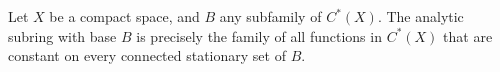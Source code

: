 Let $X$ be a compact space, and $B$ any subfamily of $C^*(X)$. The analytic subring with base $B$ is precisely the family of all functions in $C^*(X)$ that are constant on every connected stationary set of $B$.
